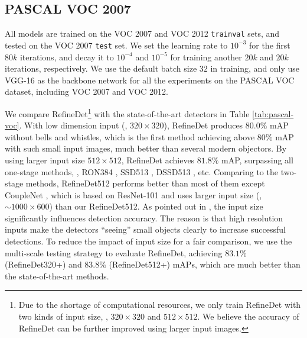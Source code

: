 \documentclass[10pt,twocolumn,letterpaper]{article}
\begin{document}
\subsection{PASCAL VOC 2007}
All models are trained on the VOC 2007 and VOC 2012 {\tt trainval} sets, and tested on the VOC 2007 {\tt test} set. We set the learning rate to $10^{-3}$ for the first $80k$ iterations, and decay it to $10^{-4}$ and $10^{-5}$ for training another $20k$ and $20k$ iterations, respectively. We use the default batch size $32$ in training, and only use VGG-16 as the backbone network for all the experiments on the PASCAL VOC dataset, including VOC 2007 and VOC 2012.

We compare RefineDet\footnote{Due to the shortage of computational resources, we only train RefineDet with two kinds of input size, \ie, $320\times320$ and $512\times512$. We believe the accuracy of RefineDet can be further improved using larger input images.} with the state-of-the-art detectors in Table \ref{tab:pascal-voc}. With low dimension input (\ie, $320\times320$), RefineDet produces $80.0\%$ mAP without bells and whistles, which is the first method achieving above $80\%$ mAP with such small input images, much better than several modern objectors. By using larger input size $512\times512$, RefineDet achieves $81.8\%$ mAP, surpassing all one-stage methods, \eg, RON384 \cite{DBLP:conf/cvpr/KongSYLLC17}, SSD513 \cite{DBLP:journals/corr/FuLRTB17}, DSSD513 \cite{DBLP:journals/corr/FuLRTB17}, etc. Comparing to the two-stage methods, RefineDet512 performs better than most of them except CoupleNet \cite{DBLP:conf/iccv/abs-1708-02863}, which is based on ResNet-101 and uses larger input size (\ie, $\sim1000\times600$) than our RefineDet512. As pointed out in \cite{DBLP:conf/cvpr/HuangRSZKFFWSG016}, the input size significantly influences detection accuracy. The reason is that high resolution inputs make the detectors ``seeing'' small objects clearly to increase successful detections. To reduce the impact of input size for a fair comparison, we use the multi-scale testing strategy to evaluate RefineDet, achieving $83.1\%$ (RefineDet320+) and $83.8\%$ (RefineDet512+) mAPs, which are much better than the state-of-the-art methods.
\end{document}
